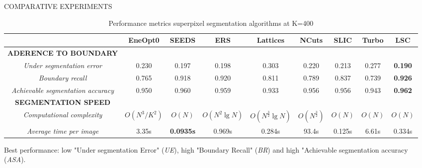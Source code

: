 \documentclass[10pt]{beamer}
\begin{document}
\begin{frame}{COMPARATIVE EXPERIMENTS}
    \begin{table}[htbp!]
        \centering
        \begin{adjustbox}{max width=\textwidth}
        \begin{tabular}{*{9}{|c}|}%
            \hline
            & EneOpt0 & SEEDS & ERS & Lattices & NCuts & SLIC & Turbo & LSC \\
            \hline
            \bfseries{ADERENCE TO BOUNDARY} & & & & & & & & \\
            \emph{Under segmentation error} & 0.230 & 0.197 & 0.198 & 0.303 & 0.220 & 0.213 & 0.277 & \bfseries{0.190}\\
            \emph{Boundary recall} & 0.765 & 0.918 & 0.920 & 0.811 & 0.789 & 0.837 & 0.739 & \bfseries{0.926}\\
            \emph{Achievable segmentation accuracy} & 0.950 & 0.960 & 0.959 & 0.933 & 0.956 & 0.956 & 0.943 & \bfseries{0.962}\\
            \hline
            \bfseries{SEGMENTATION SPEED} & & & & & & & & \\
            \emph{Computational complexity} & $ O(N^3/K^2) $ & $ O(N) $ & $ O(N^2 \lg{N}) $ & $ O(N^{\frac{3}{2}} \lg{N}) $ & $ O(N^{\frac{3}{2}}) $ & $ O(N) $ & $ O(N) $ & $ O(N) $\\
            \emph{Average time per image} & 3.35s & \bfseries{0.0935}s & 0.969s & 0.284s & 93.4s & 0.125s & 6.61s & 0.334s\\
            \hline
        \end{tabular}
        \end{adjustbox}
        \caption{Performance metrics superpixel segmentation algorithms at K=400}
        \label{table superpixels}
    \end{table}
    Best performance: low "Under segmentation Error" (\emph{UE}), high 
    "Boundary Recall" (\emph{BR}) and high "Achievable segmentation accuracy 
    (\emph{ASA}).
\end{frame}
\end{document}
